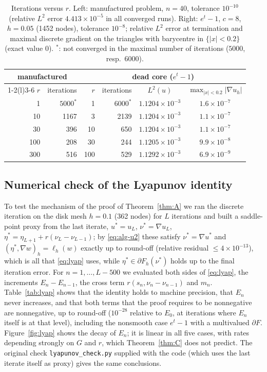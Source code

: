 \documentclass[11pt]{amsart}
\theoremstyle{definition}
\theoremstyle{remark}
\numberwithin{equation}{section}
\newcommand{\abs}[1]{\lvert #1\rvert}
\begin{document}
\begin{table}[t]
\caption{Iterations versus $r$. Left: manufactured problem, $n=40$, tolerance $10^{-10}$ (relative $L^2$ error $4.413\times10^{-5}$ in all converged runs). Right: $e^t-1$, $c=8$, $h=0.05$ (1452 nodes), tolerance $10^{-8}$; relative $L^2$ error at termination and maximal discrete gradient on the triangles with barycentre in $\{\abs x<0.2\}$ (exact value $0$). $^*$: not converged in the maximal number of iterations ($5000$, resp.\ $6000$).}\label{tab:r}
\small
\begin{tabular}{@{}rr@{\qquad}rrcc@{}}
\toprule
\multicolumn{2}{c}{manufactured} & \multicolumn{4}{c}{dead core ($e^t-1$)}\\
\cmidrule(r){1-2}\cmidrule(l){3-6}
$r$ & iterations & $r$ & iterations & $L^2(u)$ & $\max_{\abs x<0.2}\abs{\nabla u_h}$\\
\midrule
1 & $5000^*$ & 1 & $6000^*$ & $1.1204\times10^{-3}$ & $1.6\times10^{-7}$\\
10 & 1167 & 3 & 2139 & $1.1204\times10^{-3}$ & $1.1\times10^{-7}$\\
30 & 396 & 10 & 650 & $1.1204\times10^{-3}$ & $1.1\times10^{-7}$\\
100 & 208 & 30 & 244 & $1.1205\times10^{-3}$ & $9.9\times10^{-8}$\\
300 & 516 & 100 & 529 & $1.1292\times10^{-3}$ & $6.9\times10^{-9}$\\
\bottomrule
\end{tabular}
\end{table}

\subsection{Numerical check of the Lyapunov identity}\label{ssec:lyap-num}
To test the mechanism of the proof of Theorem~\ref{thm:A} we ran the discrete iteration on the disk mesh $h=0.1$ (362 nodes) for $L$ iterations and built a saddle-point proxy from the last iterate, $u^*=u_L$, $\nu^*=\nabla u_L$, $\eta^*=\eta_{L+1}+r(\nu_L-\nu_{L-1})$; by \eqref{eq:alg-u2} these satisfy $\nu^*=\nabla u^*$ and $(\eta^*,\nabla w)_h=\ell_h(w)$ exactly up to round-off (relative residual $\le4\times10^{-13}$), which is all that \eqref{eq:lyap} uses, while $\eta^*\in\partial F_h(\nu^*)$ holds up to the final iteration error. For $n=1,\dots,L-500$ we evaluated both sides of \eqref{eq:lyap}, the increments $E_n-E_{n-1}$, the cross term $r(s_n,\nu_n-\nu_{n-1})$ and $m_n$. Table~\ref{tab:lyap} shows that the identity holds to machine precision, that $E_n$ never increases, and that both terms that the proof requires to be nonnegative are nonnegative, up to round-off ($10^{-28}$ relative to $E_0$, at iterations where $E_n$ itself is at that level), including the nonsmooth case $e^t-1$ with a multivalued $\partial F$. Figure~\ref{fig:lyap} shows the decay of $E_n$; it is linear in all five cases, with rates depending strongly on $G$ and $r$, which Theorem~\ref{thm:C} does not predict. The original check \texttt{lyapunov\_check.py} supplied with the code (which uses the last iterate itself as proxy) gives the same conclusions.
\end{document}
